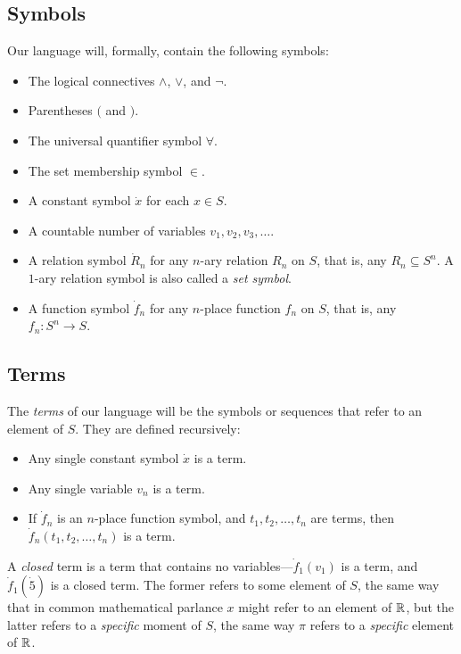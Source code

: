 \subsection{Symbols}
Our language will, formally, contain the following symbols:
\begin{itemize}
    \item The logical connectives $\land$, $\lor$, and $\neg$.
    \item Parentheses $($ and $)$.
    \item The universal quantifier symbol $\forall$.
    \item The set membership symbol $\in$.
    \item A constant symbol $\dot x$ for each $x \in S$.
    \item A countable number of variables $v_1, v_2, v_3, \ldots$.
    \item A relation symbol $\dot R_n$ for any $n$-ary relation $R_n$ on $S$, that is, any $R_n \subseteq S^n$. A $1$-ary relation symbol is also called a \textit{set symbol}.
    \item A function symbol $\dot f_n$ for any $n$-place function $f_n$ on $S$, that is, any $f_n : S^n \to S$.
\end{itemize}

\subsection{Terms}
The \textit{terms} of our language will be the symbols or sequences that refer to an element of $S$. They are defined recursively:
\begin{itemize}
    \item Any single constant symbol $\dot x$ is a term.
    \item Any single variable $v_n$ is a term.
    \item If $\dot f_n$ is an $n$-place function symbol, and $t_1, t_2, \ldots, t_n$ are terms, then $\dot f_n (t_1, t_2, \ldots, t_n)$ is a term.
\end{itemize}
A \textit{closed} term is a term that contains no variables---$\dot f_1 (v_1)$ is a term, and $\dot f_1 (\dot 5)$ is a closed term. The former refers to some element of $S$, the same way that in common mathematical parlance $x$ might refer to an element of $\mathbb{R}$, but the latter refers to a \textit{specific} moment of $S$, the same way $\pi$ refers to a \textit{specific} element of $\mathbb{R}$.


